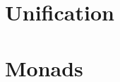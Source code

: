 \documentclass[thesis-solanki.tex]{subfiles}
\begin{document}
\section{Unification}



\section{ Monads}


\end{document}
